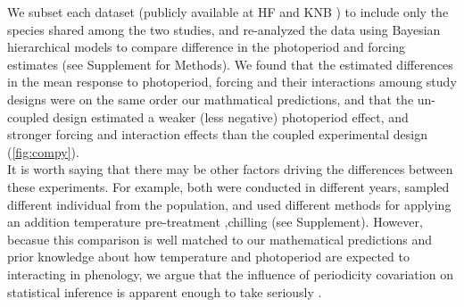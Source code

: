 \documentclass[11pt]{article}
\begin{document}
We subset each dataset (publicly available at  HF and KNB ) to include only the  species shared among the two studies, and re-analyzed the data using Bayesian hierarchical models to compare difference in the photoperiod and forcing  estimates (see Supplement for Methods).  We found that the estimated differences in the mean response to photoperiod, forcing and their interactions amoung study designs were on the same order our mathmatical predictions, and that the un-coupled design estimated a weaker (less negative) photoperiod effect, and stronger forcing and interaction effects than the coupled experimental design (\ref{fig:compy}). \\

It is worth saying that there may be other factors driving the differences between these experiments.  For example, both were conducted in different years, sampled different individual from the population, and used different methods for applying an addition temperature pre-treatment ,chilling (see Supplement). However, becasue this comparison is well matched to our mathematical predictions and prior knowledge about how temperature and photoperiod are expected to interacting in phenology, we argue that the influence of periodicity covariation on statistical inference is apparent enough to take seriously .\\
\end{document}
